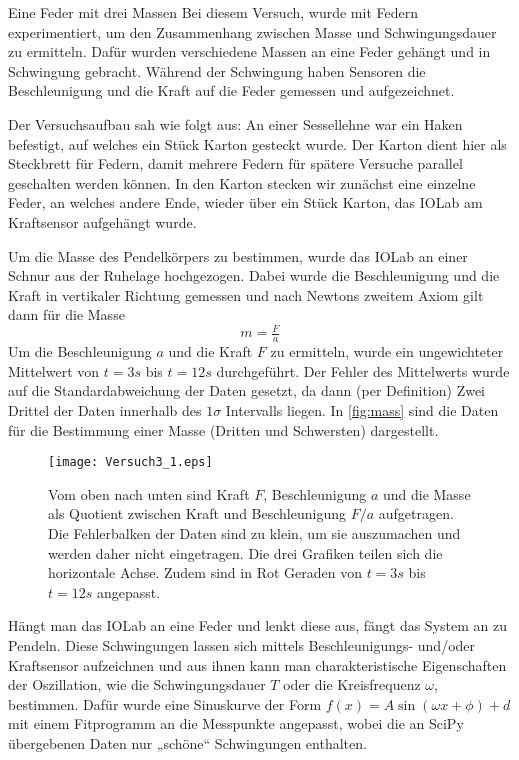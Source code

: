 \documentclass{alex_gp}
\begin{document}
\renewcommand{\labelenumi}{\alph{enumi})}


\begin{mybox}{Eine Feder mit drei Massen}
	Bei diesem Versuch, wurde mit Federn experimentiert, um den Zusammenhang zwischen Masse und Schwingungsdauer zu ermitteln. Dafür wurden verschiedene Massen an eine Feder gehängt und in Schwingung gebracht. Während der Schwingung haben Sensoren die Beschleunigung und die Kraft auf die Feder gemessen und aufgezeichnet. 
	
	Der Versuchsaufbau sah wie folgt aus: 
	An einer Sessellehne war ein Haken befestigt, auf welches ein Stück Karton gesteckt wurde. Der Karton dient hier als Steckbrett für Federn, damit mehrere Federn für spätere Versuche parallel geschalten werden können. In den Karton stecken wir zunächst eine einzelne Feder, an welches andere Ende, wieder über ein Stück Karton, das IOLab am Kraftsensor aufgehängt wurde. 
	
	Um die Masse des Pendelkörpers zu bestimmen, wurde das IOLab an einer Schnur aus der Ruhelage hochgezogen. Dabei wurde die Beschleunigung und die Kraft in vertikaler Richtung gemessen und nach Newtons zweitem Axiom gilt dann für die Masse
	\begin{equation}\label{eqn:newt}
		m = \tfrac{F}{a} 
	\end{equation}
	Um die Beschleunigung \( a \) und die Kraft \( F \) zu ermitteln, wurde ein ungewichteter Mittelwert von \( t = 3 \unit{s} \) bis \( t = 12 \unit{s} \) durchgeführt. Der Fehler des Mittelwerts wurde auf die Standardabweichung der Daten gesetzt, da dann (per Definition) Zwei Drittel der Daten innerhalb des \( 1\sigma \) Intervalls liegen. In \autoref{fig:mass} sind die Daten für die Bestimmung einer Masse (Dritten und Schwersten) dargestellt.
	\begin{figure}[H]
		\vspace{-1cm}		
		\centering
		\texttt{[image: Versuch3\_1.eps]}
		\caption{Vom oben nach unten sind Kraft \( F \), Beschleunigung \( a \) und die Masse als Quotient zwischen Kraft und Beschleunigung \( F/a \) aufgetragen. Die Fehlerbalken der Daten sind zu klein, um sie auszumachen und werden daher nicht eingetragen. Die drei Grafiken teilen sich die horizontale Achse. Zudem sind in Rot Geraden von \( t = 3 \unit{s} \) bis \( t = 12 \unit{s} \) angepasst.}
		\label{fig:mass}
	\end{figure}
	
	Hängt man das IOLab an eine Feder und lenkt diese aus, fängt das System an zu Pendeln. Diese Schwingungen lassen sich mittels Beschleunigungs- und/oder Kraftsensor aufzeichnen und aus ihnen kann man charakteristische Eigenschaften der Oszillation, wie die Schwingungsdauer \( T \) oder die Kreisfrequenz \( \omega \), bestimmen. Dafür wurde eine Sinuskurve der Form \( f(x) = A\sin(\omega x + \phi) + d \) mit einem Fitprogramm an die Messpunkte angepasst, wobei die an SciPy übergebenen Daten nur „schöne“ Schwingungen enthalten.
	

\end{mybox}
\end{document}
